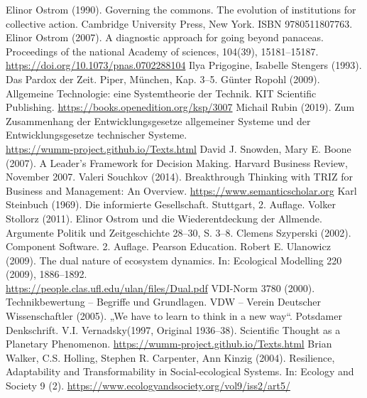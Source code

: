 \documentclass[11pt,a4paper]{article}
\begin{document}
\begin{thebibliography}{xxx}
 Elinor Ostrom (1990). Governing the commons. The
  evolution of institutions for collective action. Cambridge University Press,
  New York.  ISBN 9780511807763.
 Elinor Ostrom (2007). A diagnostic approach for going
  beyond panaceas.  Proceedings of the national Academy of sciences, 104(39),
  15181--15187.\\ \url{https://doi.org/10.1073/pnas.0702288104}
 Ilya Prigogine, Isabelle Stengers (1993). Das Pardox
  der Zeit. Piper, München, Kap. 3--5.
 Günter Ropohl (2009). Allgemeine Technologie: eine
  Systemtheorie der Technik.  KIT Scientific Publishing.
  \url{https://books.openedition.org/ksp/3007}
 Michail Rubin (2019).  Zum Zusammenhang der
  Entwicklungsgesetze allgemeiner Systeme und der Entwicklungsgesetze
  technischer Systeme. \\ \url{https://wumm-project.github.io/Texts.html}
 David J. Snowden, Mary E. Boone (2007).  A Leader’s
  Framework for Decision Making.  Harvard Business Review, November 2007.
 Valeri Souchkov (2014). Breakthrough Thinking with TRIZ
  for Business and Management: An Overview.
  \url{https://www.semanticscholar.org}
 Karl Steinbuch (1969). Die informierte Gesellschaft.
  Stuttgart, 2. Auflage.
 Volker Stollorz (2011). Elinor Ostrom und die
  Wiederentdeckung der Allmende. Argumente Politik und Zeitgeschichte 28--30,
  S. 3--8.
 Clemens Szyperski (2002). Component Software.
  2. Auf\-lage.  Pearson Education.
 Robert E. Ulanowicz (2009). The dual nature of
  ecosystem dynamics.  In: Ecological Modelling 220 (2009),
  1886–1892.\\ \url{https://people.clas.ufl.edu/ulan/files/Dual.pdf}
 VDI-Norm 3780 (2000). Technikbewertung -- Begriffe und
  Grundlagen.  
 VDW -- Verein Deutscher Wissenschaftler (2005). „We have to
  learn to think in a new way“. Potsdamer Denkschrift.
 V.I. Vernadsky(1997, Original 1936--38). Scientific
  Thought as a Planetary Phenomenon.
  \url{https://wumm-project.github.io/Texts.html}
 Brian Walker, C.S. Holling, Stephen R. Carpenter, Ann
  Kinzig (2004).  Resilience, Adaptability and Transformability in
  Social-ecological Systems.  In: Ecology and Society 9 (2).
  \url{https://www.ecologyandsociety.org/vol9/iss2/art5/}
\end{thebibliography}
\end{document}

